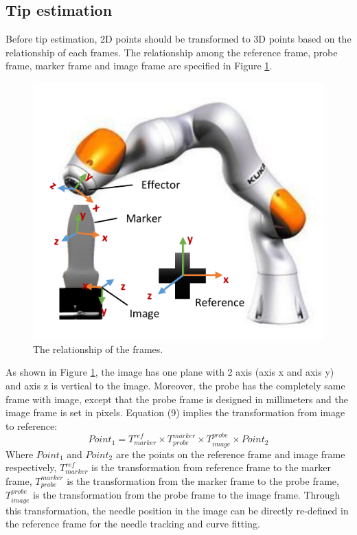 \documentclass[journal,article,submit,moreauthors,pdftex]{Definitions/mdpi}
\begin{document}
\subsection{Tip estimation}
Before tip estimation, 2D points should be transformed to 3D points based on the relationship of each frames. The relationship among the reference frame, probe frame, marker frame and image frame are specified in Figure \ref{fig:5}.

\begin{figure}[H]
	\centering
	\includegraphics[width=8.2 cm]{figures/2/f5.pdf}
	\captionsetup{width=16 cm,justification=centering}
	\caption{The relationship of the frames.}
	\label{fig:5}
\end{figure}

As shown in Figure \ref{fig:5}, the image has one plane with 2 axis (axis x and axis y) and axis z is vertical to the image. Moreover, the probe has the completely same frame with image, except that the probe frame is designed in millimeters and the image frame is set in pixels. Equation (9) implies the transformation from image to reference:
\begin{equation}
{Point}_1=T_{marker}^{ref}\times T_{probe}^{marker}\times T_{image}^{probe}\times {Point}_2
\end{equation}
Where ${{Point}_1}$ and ${{Point}_2}$ are the points on the reference frame and image frame respectively, ${T_{marker}^{ref}}$ is the transformation from reference frame to the marker frame, ${T_{probe}^{marker}}$ is the transformation from the marker frame to the probe frame, ${T_{image}^{probe}}$ is the transformation from the probe frame to the image frame. Through this transformation, the needle position in the image can be directly re-defined in the reference frame for the needle tracking and curve fitting.
\end{document}
